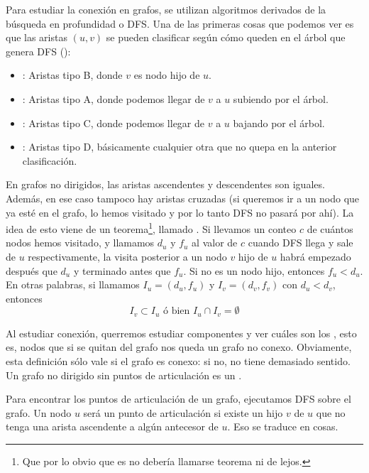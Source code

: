 \documentclass[palatino, nochap]{apuntes}
\begin{document}
Para estudiar la conexión en grafos, se utilizan algoritmos derivados de la búsqueda en profundidad o DFS. Una de las primeras cosas que podemos ver es que las aristas $(u,v)$ se pueden clasificar según cómo queden en el árbol que genera DFS ():

\begin{itemize}
\item {}: Aristas tipo B, donde $v$ es nodo hijo de $u$.
\item {}: Aristas tipo A, donde podemos llegar de $v$ a $u$ subiendo por el árbol.
\item {}: Aristas tipo C, donde podemos llegar de $v$ a $u$ bajando por el árbol.
\item {}: Aristas tipo D, básicamente cualquier otra que no quepa en la anterior clasificación.
\end{itemize}

En grafos no dirigidos, las aristas ascendentes y descendentes son iguales. Además, en ese caso tampoco hay aristas cruzadas (si queremos ir a un nodo que ya esté en el grafo, lo hemos visitado y por lo tanto DFS no pasará por ahí). La idea de esto viene de un teorema\footnote{Que por lo obvio que es no debería llamarse teorema ni de lejos.}, llamado . Si llevamos un conteo $c$ de cuántos nodos hemos visitado, y llamamos $d_u$ y $f_u$ al valor de $c$ cuando DFS llega y sale de $u$ respectivamente, la visita posterior a un nodo $v$ hijo de $u$ habrá empezado después que $d_u$ y terminado antes que $f_u$. Si no es un nodo hijo, entonces $f_u < d_u$. En otras palabras, si llamamos $I_u = (d_u, f_u)$ y $I_v = (d_v, f_v)$ con $d_u < d_v$, entonces \[ I_v ⊂ I_u \text{ ó bien } I_u ∩ I_v = ∅ \]

Al estudiar conexión, querremos estudiar componentes y ver cuáles son los , esto es, nodos que si se quitan del grafo nos queda un grafo no conexo. Obviamente, esta definición sólo vale si el grafo es conexo: si no, no tiene demasiado sentido. Un grafo no dirigido sin puntos de articulación es un .

Para encontrar los puntos de articulación de un grafo, ejecutamos DFS sobre el grafo. Un nodo $u$ será un punto de articulación si existe un hijo $v$ de $u$ que no tenga una arista ascendente a algún antecesor de $u$. Eso se traduce en cosas.
\end{document}
